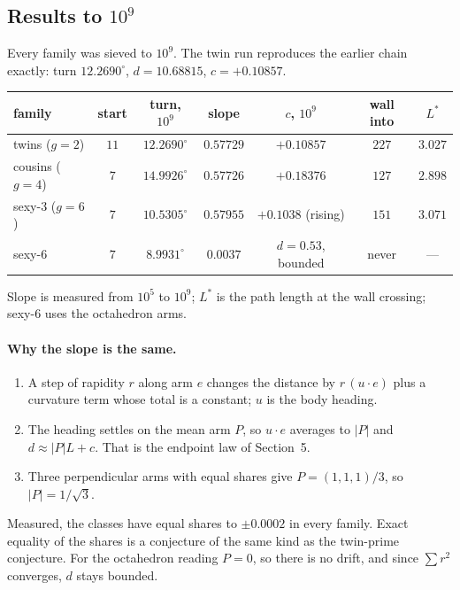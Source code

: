 \subsection{Results to $10^9$} 
Every family was sieved to $10^9$. The twin run reproduces the earlier chain exactly: turn $12.2690^\circ$, $d=10.68815$, $c=+0.10857$.
\begin{center}\small\begin{tabular}{lcccccc}
\toprule
family & start & turn, $10^9$ & slope & $c$, $10^9$ & wall into & $L^*$\\
\midrule
twins ($g=2$) & $11$ & $12.2690^\circ$ & $0.57729$ & $+0.10857$ & $227$ & $3.027$\\
cousins ($g=4$) & $7$ & $14.9926^\circ$ & $0.57726$ & $+0.18376$ & $127$ & $2.898$\\
sexy-3 ($g=6$) & $7$ & $10.5305^\circ$ & $0.57955$ & $+0.1038$ (rising) & $151$ & $3.071$\\
sexy-6 & $7$ & $8.9931^\circ$ & $0.0037$ & $d=0.53$, bounded & never & ---\\
\bottomrule
\end{tabular}\end{center}
Slope is measured from $10^5$ to $10^9$; $L^*$ is the path length at the wall crossing; sexy-6 uses the octahedron arms.

\paragraph{Why the slope is the same.} 
\begin{enumerate}
\item A step of rapidity $r$ along arm $e$ changes the distance by $r\,(u\cdot e)$ plus a curvature term whose total is a constant; $u$ is the body heading.
\item The heading settles on the mean arm $P$, so $u\cdot e$ averages to $|P|$ and $d\approx|P|L+c$. That is the endpoint law of Section~5.
\item Three perpendicular arms with equal shares give $P=(1,1,1)/3$, so $|P|=1/\sqrt3$.
\end{enumerate}
Measured, the classes have equal shares to $\pm0.0002$ in every family. Exact equality of the shares is a conjecture of the same kind as the twin-prime conjecture. For the octahedron reading $P=0$, so there is no drift, and since $\sum r^2$ converges, $d$ stays bounded.

